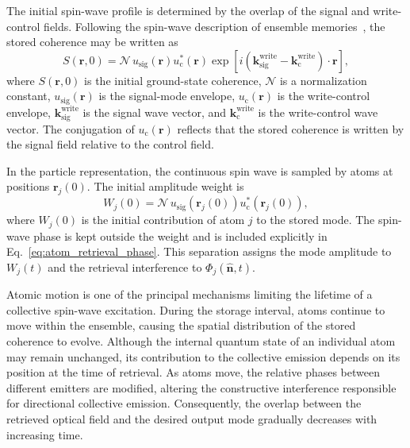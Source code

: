 The initial spin-wave profile is determined by the overlap of the signal and write-control fields. Following the spin-wave description of ensemble memories~\cite{PsiL-odamIFm_GorshkovEtAl_2007}, the stored coherence may be written as
\begin{equation}
    S(\mathbf{r},0)
    =
    \mathcal{N}
    \,
    u_{\mathrm{sig}}(\mathbf{r})
    u_{\mathrm{c}}^{*}(\mathbf{r})
    \exp\left[
        i
        \left(
            \mathbf{k}_{\mathrm{sig}}^{\mathrm{write}}
            -
            \mathbf{k}_{\mathrm{c}}^{\mathrm{write}}
        \right)
        \cdot
        \mathbf{r}
    \right],
    \label{eq:initial_spin_wave_profile}
\end{equation}
where $S(\mathbf{r},0)$ is the initial ground-state coherence, $\mathcal{N}$ is a normalization constant, $u_{\mathrm{sig}}(\mathbf{r})$ is the signal-mode envelope, $u_{\mathrm{c}}(\mathbf{r})$ is the write-control envelope, $\mathbf{k}_{\mathrm{sig}}^{\mathrm{write}}$ is the signal wave vector, and $\mathbf{k}_{\mathrm{c}}^{\mathrm{write}}$ is the write-control wave vector. The conjugation of $u_{\mathrm{c}}(\mathbf{r})$ reflects that the stored coherence is written by the signal field relative to the control field.

In the particle representation, the continuous spin wave is sampled by atoms at positions $\mathbf{r}_j(0)$. The initial amplitude weight is
\begin{equation}
    W_j(0)
    =
    \mathcal{N}
    \,
    u_{\mathrm{sig}}\!\left(\mathbf{r}_j(0)\right)
    u_{\mathrm{c}}^{*}\!\left(\mathbf{r}_j(0)\right),
    \label{eq:initial_atomic_weight}
\end{equation}
where $W_j(0)$ is the initial contribution of atom $j$ to the stored mode. The spin-wave phase is kept outside the weight and is included explicitly in Eq.~\eqref{eq:atom_retrieval_phase}. This separation assigns the mode amplitude to $W_j(t)$ and the retrieval interference to $\Phi_j(\hat{\mathbf n},t)$.

Atomic motion is one of the principal mechanisms limiting the lifetime of a collective spin-wave excitation. During the storage interval, atoms continue to move within the ensemble, causing the spatial distribution of the stored coherence to evolve. Although the internal quantum state of an individual atom may remain unchanged, its contribution to the collective emission depends on its position at the time of retrieval. As atoms move, the relative phases between different emitters are modified, altering the constructive interference responsible for directional collective emission. Consequently, the overlap between the retrieved optical field and the desired output mode gradually decreases with increasing time.

